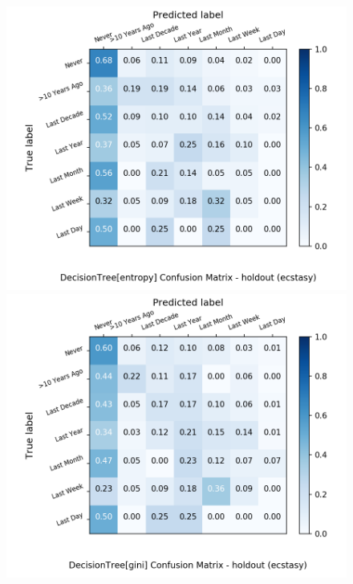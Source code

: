 \begin{figure}[H]
	\centering
	\begin{minipage}[b]{0.32\textwidth}
		\includegraphics[width=1.1\textwidth]{Plots/drugs/ecstasy_DecisionTree_entropy_balance_False_holdout.png}
	\end{minipage}
	\begin{minipage}[b]{0.32\textwidth}
		\includegraphics[width=1.1\textwidth]{Plots/drugs/ecstasy_DecisionTree_gini_balance_False_holdout.png}
	\end{minipage}

\end{figure}

